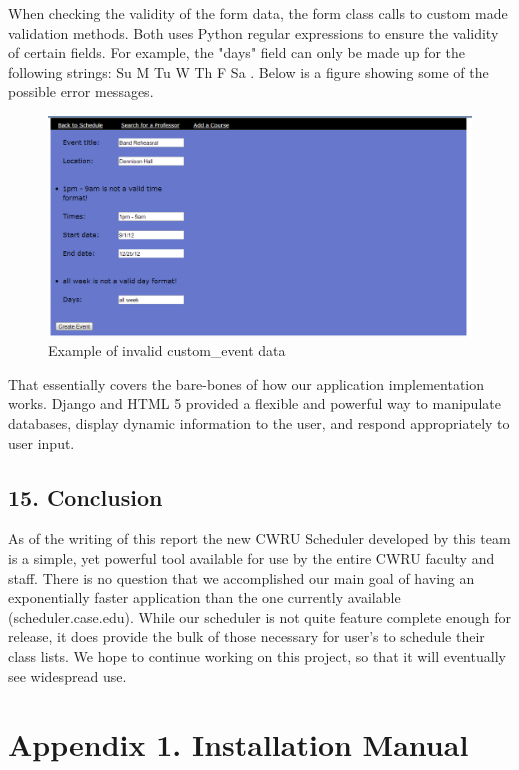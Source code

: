 \documentclass[pdftex,12pt,letter]{article}
\begin{document}
When checking the validity of the form data, the form class calls to custom made validation methods. Both uses Python regular expressions to ensure the validity of certain fields. For example, the "days" field can only be made up for the following strings: Su M Tu W Th F Sa . Below is a figure showing some of the possible error messages.
\begin{figure}
\includegraphics[width=6in]{eventErr.png}
\caption{Example of invalid custom\_event data}
\end{figure}
\FloatBarrier

That essentially covers the bare-bones of how our application implementation works. Django and HTML 5 provided a flexible and powerful way to manipulate databases, display dynamic information to the user, and respond appropriately to user input.

%

\subsection*{15. Conclusion}
As of the writing of this report the new CWRU Scheduler developed by this team is a simple, yet powerful tool available for use by the entire CWRU faculty and staff. There is no question that we accomplished our main goal of having an exponentially faster application than the one currently available (scheduler.case.edu). While our scheduler is not quite feature complete enough for release, it does provide the bulk of those necessary for user's to schedule their class lists. We hope to continue working on this project, so that it will eventually see widespread use.

\newpage
\appendix
\section{Appendix 1. Installation Manual}
\end{document}
